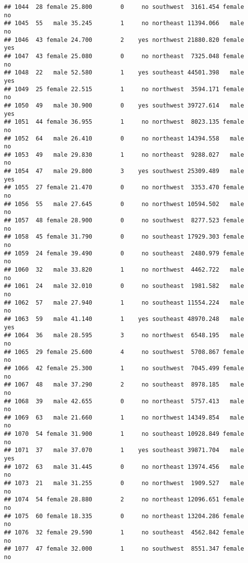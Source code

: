 \documentclass[
]{article}
\begin{document}
\begin{verbatim}
## 1044  28 female 25.800        0     no southwest  3161.454 female       no
## 1045  55   male 35.245        1     no northeast 11394.066   male       no
## 1046  43 female 24.700        2    yes northwest 21880.820 female      yes
## 1047  43 female 25.080        0     no northeast  7325.048 female       no
## 1048  22   male 52.580        1    yes southeast 44501.398   male      yes
## 1049  25 female 22.515        1     no northwest  3594.171 female       no
## 1050  49   male 30.900        0    yes southwest 39727.614   male      yes
## 1051  44 female 36.955        1     no northwest  8023.135 female       no
## 1052  64   male 26.410        0     no northeast 14394.558   male       no
## 1053  49   male 29.830        1     no northeast  9288.027   male       no
## 1054  47   male 29.800        3    yes southwest 25309.489   male      yes
## 1055  27 female 21.470        0     no northwest  3353.470 female       no
## 1056  55   male 27.645        0     no northwest 10594.502   male       no
## 1057  48 female 28.900        0     no southwest  8277.523 female       no
## 1058  45 female 31.790        0     no southeast 17929.303 female       no
## 1059  24 female 39.490        0     no southeast  2480.979 female       no
## 1060  32   male 33.820        1     no northwest  4462.722   male       no
## 1061  24   male 32.010        0     no southeast  1981.582   male       no
## 1062  57   male 27.940        1     no southeast 11554.224   male       no
## 1063  59   male 41.140        1    yes southeast 48970.248   male      yes
## 1064  36   male 28.595        3     no northwest  6548.195   male       no
## 1065  29 female 25.600        4     no southwest  5708.867 female       no
## 1066  42 female 25.300        1     no southwest  7045.499 female       no
## 1067  48   male 37.290        2     no southeast  8978.185   male       no
## 1068  39   male 42.655        0     no northeast  5757.413   male       no
## 1069  63   male 21.660        1     no northwest 14349.854   male       no
## 1070  54 female 31.900        1     no southeast 10928.849 female       no
## 1071  37   male 37.070        1    yes southeast 39871.704   male      yes
## 1072  63   male 31.445        0     no northeast 13974.456   male       no
## 1073  21   male 31.255        0     no northwest  1909.527   male       no
## 1074  54 female 28.880        2     no northeast 12096.651 female       no
## 1075  60 female 18.335        0     no northeast 13204.286 female       no
## 1076  32 female 29.590        1     no southeast  4562.842 female       no
## 1077  47 female 32.000        1     no southwest  8551.347 female       no

\end{verbatim}
\end{document}
